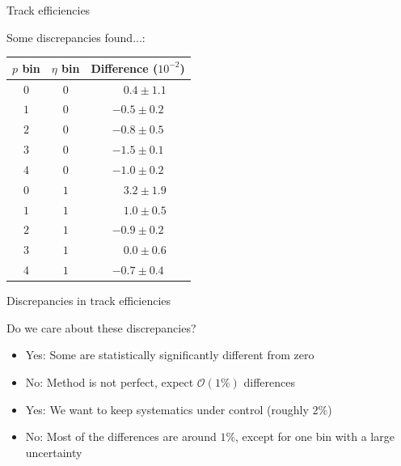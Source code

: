 \documentclass[xcolor={dvipsnames}]{beamer}
\begin{document}
\begin{frame}{Track efficiencies}
  \vspace{0.0cm}
  \begin{center}
    Some discrepancies found...:
  \end{center}
  \begin{center}
    \begin{tabular}{ccc}
      \hline
      $p$ bin & $\eta$ bin & Difference ($10^{-2}$) \\
      \hline
      $0$     & $0$        & $\phantom{-}0.4 \pm 1.1$ \\
      $1$     & $0$        & $-0.5 \pm 0.2$ \\
      $2$     & $0$        & $-0.8 \pm 0.5$ \\
      $3$     & $0$        & $-1.5 \pm 0.1$ \\
      $4$     & $0$        & $-1.0 \pm 0.2$ \\
      $0$     & $1$        & $\phantom{-}3.2 \pm 1.9$ \\
      $1$     & $1$        & $\phantom{-}1.0 \pm 0.5$ \\
      $2$     & $1$        & $-0.9 \pm 0.2$ \\
      $3$     & $1$        & $\phantom{-}0.0 \pm 0.6$ \\
      $4$     & $1$        & $-0.7 \pm 0.4$ \\
      \hline
    \end{tabular}
  \end{center}
\end{frame}

\begin{frame}{Discrepancies in track efficiencies}
  \vspace{0.0cm}
  \begin{center}
    Do we care about these discrepancies?
  \end{center}
  \begin{itemize}
    \setlength\itemsep{1.0em}
    \item{Yes: Some are statistically significantly different from zero}
    \item{No: Method is not perfect, expect $\mathcal{O}(1\%)$ differences}
    \item{Yes: We want to keep systematics under control (roughly $2\%$)}
    \item{No: Most of the differences are around $1\%$, except for one bin with a large uncertainty}
  \end{itemize}
\end{frame}
\end{document}
